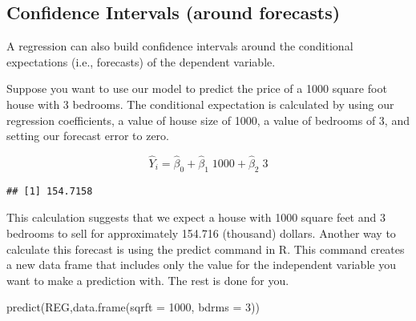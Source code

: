 \documentclass[
]{book}
\newenvironment{Shaded}{\begin{snugshade}}{\end{snugshade}}
\newcommand{\AttributeTok}[1]{\textcolor[rgb]{0.77,0.63,0.00}{#1}}
\newcommand{\DecValTok}[1]{\textcolor[rgb]{0.00,0.00,0.81}{#1}}
\newcommand{\FunctionTok}[1]{\textcolor[rgb]{0.00,0.00,0.00}{#1}}
\newcommand{\NormalTok}[1]{#1}
\newcommand{\OtherTok}[1]{\textcolor[rgb]{0.56,0.35,0.01}{#1}}
\newcommand{\SpecialCharTok}[1]{\textcolor[rgb]{0.00,0.00,0.00}{#1}}
\begin{document}
\hypertarget{confidence-intervals-around-forecasts-1}{%
\subsection{Confidence Intervals (around forecasts)}\label{confidence-intervals-around-forecasts-1}}

A regression can also build confidence intervals around the conditional expectations (i.e., forecasts) of the dependent variable.

Suppose you want to use our model to predict the price of a 1000 square foot house with 3 bedrooms. The conditional expectation is calculated by using our regression coefficients, a value of house size of 1000, a value of bedrooms of 3, and setting our forecast error to zero.

\[\hat{Y}_i=\hat{\beta}_0+\hat{\beta}_1\;1000+\hat{\beta}_2\;3\]

\begin{Shaded}
\end{Shaded}

\begin{verbatim}
## [1] 154.7158
\end{verbatim}

This calculation suggests that we expect a house with 1000 square feet and 3 bedrooms to sell for approximately 154.716 (thousand) dollars. Another way to calculate this forecast is using the predict command in R. This command creates a new data frame that includes only the value for the independent variable you want to make a prediction with. The rest is done for you.

\begin{Shaded}
\begin{Highlighting}[]
\FunctionTok{predict}\NormalTok{(REG,}\FunctionTok{data.frame}\NormalTok{(}\AttributeTok{sqrft =} \DecValTok{1000}\NormalTok{, }\AttributeTok{bdrms =} \DecValTok{3}\NormalTok{))}
\end{Highlighting}
\end{Shaded}
\end{document}
